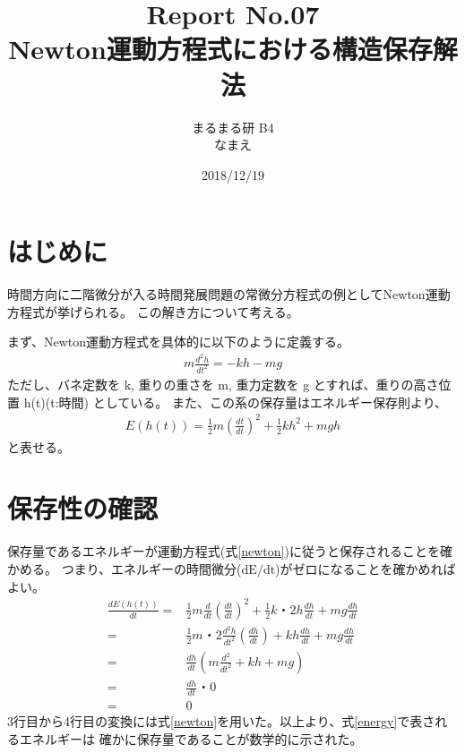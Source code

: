 \documentclass[12pt]{ltjsarticle}
\begin{document}
\begin{titlepage}
\title{Report No.07　\\ Newton運動方程式における構造保存解法}
\author{まるまる研 B4 \\ なまえ}
\date{2018/12/19}
\maketitle
\tableofcontents

\end{titlepage}

\section{はじめに}
時間方向に二階微分が入る時間発展問題の常微分方程式の例としてNewton運動方程式が挙げられる。
この解き方について考える。

まず、Newton運動方程式を具体的に以下のように定義する。
\begin{eqnarray}
    m\frac{d^2 h}{dt^2} = -kh-mg
    \label{newton}
\end{eqnarray}
ただし、バネ定数を k, 重りの重さを m, 重力定数を g とすれば、重りの高さ位置 h(t)(t:時間) としている。
また、この系の保存量はエネルギー保存則より、
\begin{eqnarray}
    E(h(t)) = \frac{1}{2}m\left(\frac{dt}{dt}\right)^2 + \frac{1}{2}kh^2 + mgh
    \label{energy}
\end{eqnarray}
と表せる。

\section{保存性の確認}
保存量であるエネルギーが運動方程式(式\ref{newton})に従うと保存されることを確かめる。
つまり、エネルギーの時間微分($\text{dE}/\text{dt}$)がゼロになることを確かめればよい。
\begin{equation*}
    \begin{split}
    \frac{dE(h(t))}{dt} = &\frac{1}{2}m\frac{d}{dt}\left(\frac{dt}{dt}\right)^2 
    + \frac{1}{2}k・2h\frac{dh}{dt} + mg\frac{dh}{dt} \\
         = & \frac{1}{2}m・2\frac{d^2 h}{dt^2}\left(\frac{dh}{dt}\right)+kh\frac{dh}{dt}+mg\frac{dh}{dt}\\
         = & \frac{dh}{dt}\left(m\frac{d^2}{dt^2}+kh+mg\right) \\
         = & \frac{dh}{dt}・0 \\
         = & 0
\end{split}
\end{equation*}
3行目から4行目の変換には式\ref{newton}を用いた。以上より、式\ref{energy}で表されるエネルギーは
確かに保存量であることが数学的に示された。
\end{document}

